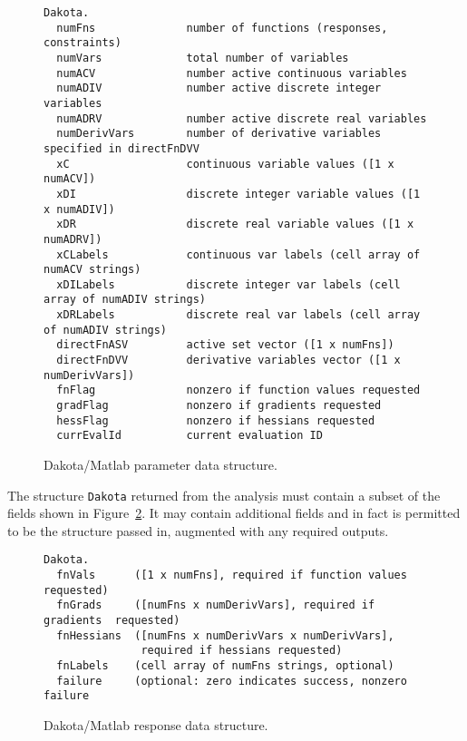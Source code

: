 \begin{figure}
\centering
\begin{bigbox}
\begin{small}
\begin{verbatim}
Dakota.
  numFns              number of functions (responses, constraints)
  numVars             total number of variables
  numACV              number active continuous variables
  numADIV             number active discrete integer variables
  numADRV             number active discrete real variables
  numDerivVars        number of derivative variables specified in directFnDVV
  xC                  continuous variable values ([1 x numACV]) 
  xDI                 discrete integer variable values ([1 x numADIV])
  xDR                 discrete real variable values ([1 x numADRV])
  xCLabels            continuous var labels (cell array of numACV strings)
  xDILabels           discrete integer var labels (cell array of numADIV strings)
  xDRLabels           discrete real var labels (cell array of numADIV strings)
  directFnASV         active set vector ([1 x numFns])
  directFnDVV         derivative variables vector ([1 x numDerivVars])
  fnFlag              nonzero if function values requested
  gradFlag            nonzero if gradients requested
  hessFlag            nonzero if hessians requested
  currEvalId          current evaluation ID
\end{verbatim}
\end{small}
\end{bigbox}
\caption{Dakota/Matlab parameter data
structure.\label{advint:figure:matlabparams}}
\end{figure}

The structure {\tt Dakota} returned from the analysis must contain a
subset of the fields shown in
Figure~\ref{advint:figure:matlabresponse}. It may contain additional
fields and in fact is permitted to be the structure passed in,
augmented with any required outputs.
\begin{figure} \centering
\begin{bigbox}
\begin{small}
\begin{verbatim}
Dakota.
  fnVals      ([1 x numFns], required if function values requested)
  fnGrads     ([numFns x numDerivVars], required if gradients  requested)
  fnHessians  ([numFns x numDerivVars x numDerivVars], 
               required if hessians requested)
  fnLabels    (cell array of numFns strings, optional)
  failure     (optional: zero indicates success, nonzero failure
\end{verbatim}
\end{small}
\end{bigbox}
\caption{Dakota/Matlab response data
structure.\label{advint:figure:matlabresponse}}
\end{figure}


